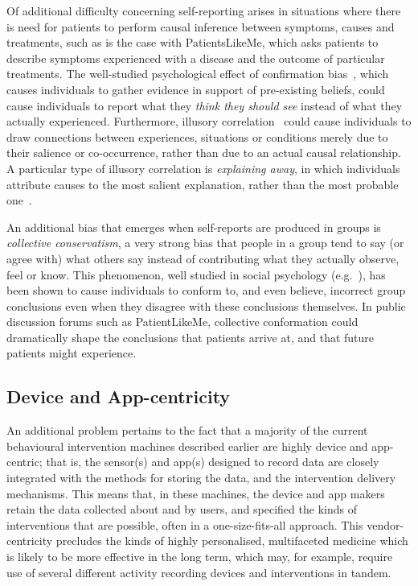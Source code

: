\documentclass{sig-alternate}
\begin{document}
Of additional difficulty concerning self-reporting arises in situations
where there is need for patients to perform causal inference between
symptoms, causes and treatments, such as is the case with PatientsLikeMe,
which asks patients to describe symptoms experienced with a disease
and the outcome of particular treatments.  The well-studied
psychological effect of confirmation bias~\cite{confirmationbias},
which causes individuals to gather evidence in support of pre-existing
beliefs, could cause individuals to report what they \emph{think they
  should see} instead of what they actually experienced.  Furthermore,
illusory correlation~\cite{chapman1969illusory} could cause
individuals to draw connections between experiences, situations or
conditions merely due to their salience or co-occurrence, rather than
due to an actual causal relationship. A particular type of illusory
correlation is \emph{explaining away}, in which individuals attribute
causes to the most salient explanation, rather than the most probable
one~\cite{gilovich1983biased}.

An additional bias that emerges when self-reports are produced in
groups is \emph{collective conservatism}, a very strong bias that
people in a group tend to say (or agree with) what others say instead
of contributing what they actually observe, feel or know.  This
phenomenon, well studied in social psychology
(e.g.~\cite{aronson2003readings}), has been shown to cause individuals
to conform to, and even believe, incorrect group conclusions even when
they disagree with these conclusions themselves.  In public discussion
forums such as PatientLikeMe, collective conformation could dramatically
shape the conclusions that patients arrive at, and that future patients
might experience.

\subsection{Device and App-centricity}

An additional problem pertains to the fact that a majority of the
current behavioural intervention machines described earlier are highly
device and app-centric; that is, the sensor(s) and app(s) designed to
record data are closely integrated with the methods for storing the
data, and the intervention delivery mechanisms.  This means that, in
these machines, the device and app makers retain the data collected
about and by users, and specified the kinds of interventions that are
possible, often in a one-size-fits-all approach.  This
vendor-centricity precludes the kinds of highly personalised,
multifaceted medicine which is likely to be more effective in the long
term, which may, for example, require use of several different
activity recording devices and interventions in tandem.
\end{document}
